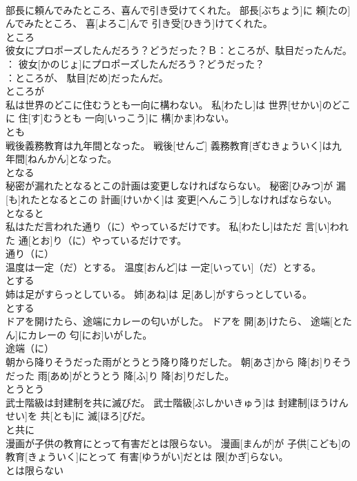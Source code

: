 \documentclass[8pt]{extreport}
\begin{document}
\begin{CJK}{UTF8}{min}
\\	部長に頼んでみたところ、喜んで引き受けてくれた。	部長[ぶちょう]に 頼[たの]んでみたところ、 喜[よろこ]んで 引き受[ひきう]けてくれた。	
\\	ところ	
\\	彼女にプロポーズしたんだろう？どうだった？Ｂ：ところが、駄目だったんだ。	
\\	[えい]： 彼女[かのじょ]にプロポーズしたんだろう？どうだった？ 
\\	[びー]：ところが、 駄目[だめ]だったんだ。	
\\	ところが	
\\	私は世界のどこに住むうとも一向に構わない。	私[わたし]は 世界[せかい]のどこに 住[す]むうとも 一向[いっこう]に 構[かま]わない。	
\\	とも	
\\	戦後義務教育は九年間となった。	戦後[せんご] 義務教育[ぎむきょういく]は九 年間[ねんかん]となった。	
\\	となる	
\\	秘密が漏れたとなるとこの計画は変更しなければならない。	秘密[ひみつ]が 漏[も]れたとなるとこの 計画[けいかく]は 変更[へんこう]しなければならない。	
\\	となると	
\\	私はただ言われた通り（に）やっているだけです。	私[わたし]はただ 言[い]われた 通[とお]り（に）やっているだけです。	
\\	通り（に）	
\\	温度は一定（だ）とする。	温度[おんど]は 一定[いってい]（だ）とする。	
\\	とする 
\\	姉は足がすらっとしている。	姉[あね]は 足[あし]がすらっとしている。	
\\	とする 
\\	ドアを開けたら、途端にカレーの匂いがした。	ドアを 開[あ]けたら、 途端[とたん]にカレーの 匂[にお]いがした。	
\\	途端（に）	
\\	朝から降りそうだった雨がとうとう降り降りだした。	朝[あさ]から 降[お]りそうだった 雨[あめ]がとうとう 降[ふ]り 降[お]りだした。	
\\	とうとう	
\\	武士階級は封建制を共に滅びだ。	武士階級[ぶしかいきゅう]は 封建制[ほうけんせい]を 共[とも]に 滅[ほろ]びだ。	
\\	と共に	
\\	漫画が子供の教育にとって有害だとは限らない。	漫画[まんが]が 子供[こども]の 教育[きょういく]にとって 有害[ゆうがい]だとは 限[かぎ]らない。	
\\	とは限らない	

\end{CJK}
\end{document}

